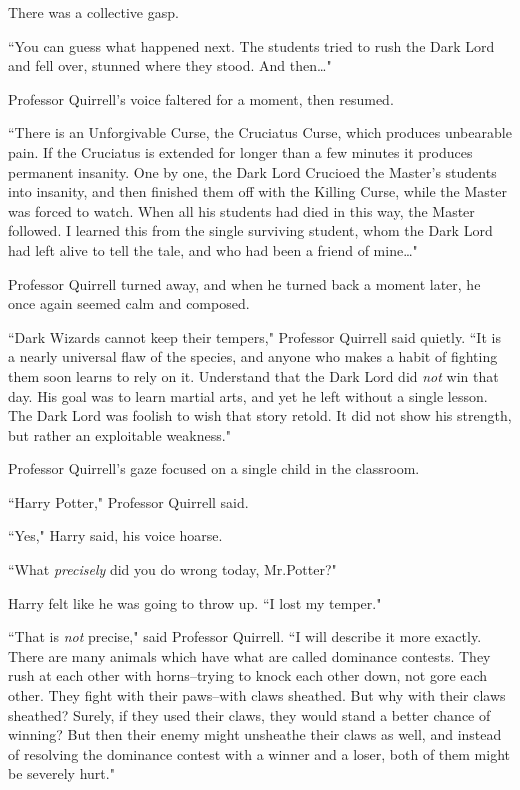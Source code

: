There was a collective gasp.

``You can guess what happened next. The students tried to rush the Dark Lord and fell over, stunned where they stood. And then{\ldots}"

Professor Quirrell's voice faltered for a moment, then resumed.

``There is an Unforgivable Curse, the Cruciatus Curse, which produces unbearable pain. If the Cruciatus is extended for longer than a few minutes it produces permanent insanity. One by one, the Dark Lord Crucioed the Master's students into insanity, and then finished them off with the Killing Curse, while the Master was forced to watch. When all his students had died in this way, the Master followed. I learned this from the single surviving student, whom the Dark Lord had left alive to tell the tale, and who had been a friend of mine{\ldots}"

Professor Quirrell turned away, and when he turned back a moment later, he once again seemed calm and composed.

``Dark Wizards cannot keep their tempers," Professor Quirrell said quietly. ``It is a nearly universal flaw of the species, and anyone who makes a habit of fighting them soon learns to rely on it. Understand that the Dark Lord did \emph{not} win that day. His goal was to learn martial arts, and yet he left without a single lesson. The Dark Lord was foolish to wish that story retold. It did not show his strength, but rather an exploitable weakness."

Professor Quirrell's gaze focused on a single child in the classroom.

``Harry Potter," Professor Quirrell said.

``Yes," Harry said, his voice hoarse.

``What \emph{precisely} did you do wrong today, Mr.\?Potter?"

Harry felt like he was going to throw up. ``I lost my temper."

``That is \emph{not} precise," said Professor Quirrell. ``I will describe it more exactly. There are many animals which have what are called dominance contests. They rush at each other with horns\---trying to knock each other down, not gore each other. They fight with their paws\---with claws sheathed. But why with their claws sheathed? Surely, if they used their claws, they would stand a better chance of winning? But then their enemy might unsheathe their claws as well, and instead of resolving the dominance contest with a winner and a loser, both of them might be severely hurt."

